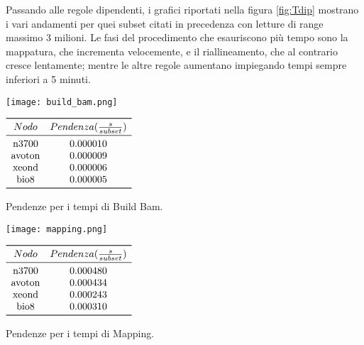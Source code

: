 Passando alle regole dipendenti, i grafici riportati nella figura \ref{fig:Tdip} mostrano i vari andamenti per quei subset citati in precedenza con letture di range massimo 3 milioni.
Le fasi del procedimento che esauriscono più tempo sono la mappatura, che incrementa velocemente, e il riallineamento, che al contrario cresce lentamente; mentre le altre regole aumentano impiegando tempi sempre inferiori a 5 minuti.
\begin{table}[H]
  \begin{minipage}[b]{0.4\linewidth}
	\centering
	\texttt{[image: build\_bam.png]}
	\label{subfig:BB}
  \end{minipage}
  \hfill  
  \begin{varwidth}[b]{0.4\linewidth}
    \centering
	$\begin{array}{*{2}{c}}
		\toprule
			Nodo & Pendenza(\frac{s}{subset})\\
		\midrule
			\text{n3700} & 0.000010 \\
			\text{avoton} & 0.000009 \\
			\text{xeond} & 0.000006 \\
			\text{bio8} & 0.000005 \\
		\bottomrule
	\end{array}$
    \caption{Pendenze per i tempi di Build Bam.}
    \label{tab:Bb}
  \end{varwidth}%
\end{table}

\begin{table}[H]
  \begin{minipage}[b]{0.4\linewidth}
	\centering
	\texttt{[image: mapping.png]}	
	\label{subfig:Map}
  \end{minipage}
  \hfill  
  \begin{varwidth}[b]{0.4\linewidth}
    \centering
	$\begin{array}{*{2}{c}}
		\toprule
			Nodo & Pendenza(\frac{s}{subset})\\
		\midrule
			\text{n3700} & 0.000480 \\
			\text{avoton} & 0.000434 \\
			\text{xeond} & 0.000243 \\
			\text{bio8} & 0.000310 \\
		\bottomrule
	\end{array}$
    \caption{Pendenze per i tempi di Mapping.}
    \label{tab:Mp}
  \end{varwidth}%
\end{table}

